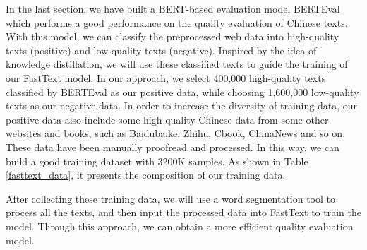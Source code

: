 \documentclass{article}
\begin{document}
In the last section, we have built a BERT-based evaluation model BERTEval which performs a good performance on the quality evaluation of Chinese texts. With this model, we can classify the preprocessed web data into high-quality texts (positive) and low-quality texts (negative). Inspired by the idea of knowledge distillation, we will use these classified texts to guide the training of our FastText model. In our approach, we select 400,000 high-quality texts classified by BERTEval as our positive data, while choosing 1,600,000 low-quality texts as our negative data. In order to increase the diversity of training data, our positive data also include some high-quality Chinese data from some other websites and books, such as Baidubaike, Zhihu, Cbook, ChinaNews and so on. These data have been manually proofread and processed. In this way, we can build a good training dataset with 3200K samples. As shown in Table \ref{fasttext_data}, it presents the composition of our training data.

After collecting these training data, we will use a word segmentation tool to process all the texts, and then input the processed data into FastText to train the model. Through this approach, we can obtain a more efficient quality evaluation model.



\end{document}
